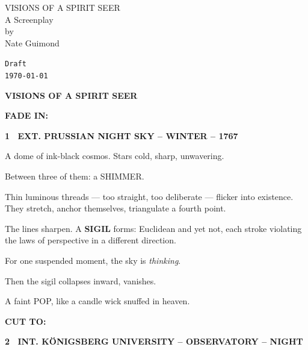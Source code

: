 \documentclass[12pt]{article}
\newcommand{\scene}[2]{%
  \vspace{1.8\baselineskip}%
  \noindent\textbf{#1 \ #2}\par\vspace{0.4\baselineskip}%
}
\newcommand{\transition}[1]{%
  \vspace{0.6\baselineskip}%
  \begin{flushright}\textbf{#1}\end{flushright}%
}
\newcommand{\centered}[1]{%
  \vspace{0.8\baselineskip}%
  \begin{center}#1\end{center}%
}
\begin{document}

\vspace*{3cm}

\begin{center}
{\Large VISIONS OF A SPIRIT SEER}\\[1.5cm]
{\large A Screenplay}\\[1.5cm]
by\\[0.5cm]
{\large Nate Guimond}\\[2cm]
\end{center}

\vfill

\begin{center}
\texttt{Draft}\\[0.2cm]
\texttt{\today}
\end{center}

\newpage

\centered{\textbf{VISIONS OF A SPIRIT SEER}}

\centered{\textbf{FADE IN:}}


\scene{1}{EXT. PRUSSIAN NIGHT SKY -- WINTER -- 1767}

A dome of ink-black cosmos. Stars cold, sharp, unwavering.

Between three of them: a SHIMMER.

Thin luminous threads --- too straight, too deliberate --- flicker into
existence. They stretch, anchor themselves, triangulate a fourth point.

The lines sharpen. A \textbf{SIGIL} forms: Euclidean and yet not, each stroke
violating the laws of perspective in a different direction.

For one suspended moment, the sky is \emph{thinking}.

Then the sigil collapses inward, vanishes.

A faint POP, like a candle wick snuffed in heaven.

\transition{CUT TO:}


\scene{2}{INT. KÖNIGSBERG UNIVERSITY -- OBSERVATORY -- NIGHT}
\end{document}
